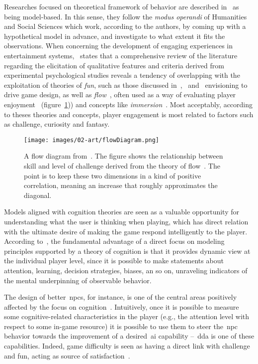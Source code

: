 Researches focused on theoretical framework of behavior are described in~\cite{yannakakis_player_2013} as being model-based. In this sense, they follow the \textit{modus operandi} of Humanities and Social Sciences which work, according to the authors, by coming up with a hypothetical model in advance, and investigate to what extent it fits the observations. When concerning the development of engaging experiences in entertainment systems,~\cite{yannakakis_how_2008} states that a comprehensive review of the literature regarding the elicitation of qualitative features and criteria derived from experimental psychological studies reveals a tendency of overlapping with the exploitation of theories of \textit{fun}, such as those discussed in~\cite{malone_what_1980},~\cite{lazzaro_why_2004} and~\cite{koster_theory_2013} envisioning to drive game design, as well as \textit{flow}~\citep{csikszentmihalyi_flow:_1991}, often used as a way of evaluating player enjoyment~\citep{sweetser_gameflow:_2005, cowley_toward_2008} (figure~\ref{flowDiagram})) and concepts like \textit{immersion}~\citep{calleja_digital_2007}. Most acceptably, according to theses theories and concepts, player engagement is most related to factors such as challenge, curiosity and fantasy.

\begin{figure}[htp]
  \centering  
  \texttt{[image: images/02-art/flowDiagram.png]}
  \caption{A flow diagram from~\cite{hunicke_ai_2004}. The figure shows the relationship between skill and level of challenge derived from the theory of flow~\citep{csikszentmihalyi_flow:_1991}. The point is to keep these two dimensions in a kind of positive correlation, meaning an increase that roughly approximates the diagonal.}
  \label{flowDiagram}
\end{figure}

Models aligned with cognition theories are seen as a valuable opportunity for understanding what the user is thinking when playing, which has direct relation with the ultimate desire of making the game respond intelligently to the player. According to~\cite{bohil_cognitive_2007}, the fundamental advantage of a direct focus on modeling principles supported by a theory of cognition is that it provides dynamic view at the individual player level, since it is possible to make statements about attention, learning, decision strategies, biases, an so on, unraveling indicators of the mental underpinning of observable behavior. 

The design of better~\glspl{npc}, for instance, is one of the central areas positively affected by the focus on cognition~\citep{funge_ai_1999}. Intuitively, once it is possible to measure some cognitive-related characteristics in the player (e.g., the attention level with respect to some in-game resource) it is possible to use them to steer the~\gls{npc} behavior towards the improvement of a desired~\gls{ai} capability --~\gls{dda} is one of these capabilities. Indeed, game difficulty is seen as having a direct link with challenge and fun, acting as source of satisfaction~\citep{koster_theory_2013,yannakakis_modeling_2006}. 

